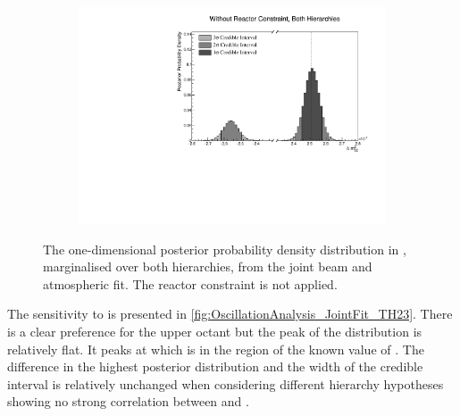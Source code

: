 \begin{figure}[h]
  \begin{subfigure}[t]{0.98\textwidth}
    \includegraphics[width=\textwidth, trim={0mm 0mm 0mm 0mm}, clip,page=1]{Figures/OA/JointFit/Contours_1D_dm32_BH_1_woRC_UnSmeared_CredibleInterval.pdf}
  \end{subfigure}
  \caption{The one-dimensional posterior probability density distribution in , marginalised over both hierarchies, from the joint beam and atmospheric fit. The reactor constraint is not applied.}
  \label{fig:OscillationAnalysis_JointFit_DELM32}
\end{figure}

The sensitivity to  is presented in \autoref{fig:OscillationAnalysis_JointFit_TH23}. There is a clear preference for the upper octant but the peak of the distribution is relatively flat. It peaks at  which is in the region of the known value of . The difference in the highest posterior distribution and the width of the credible interval is relatively unchanged when considering different hierarchy hypotheses showing no strong correlation between  and .

